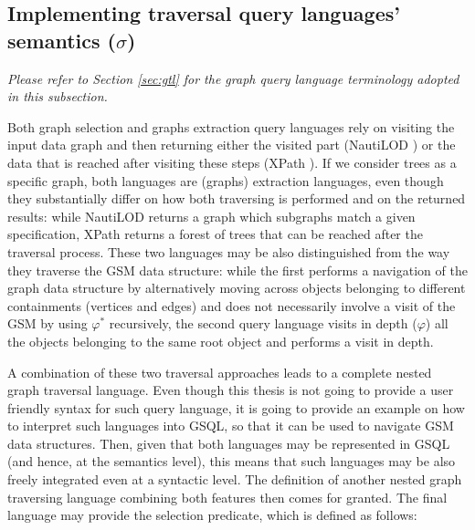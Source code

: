 
\subsection{Implementing traversal query languages' semantics ($\sigma$)}\label{traversalDef}
\textit{Please refer to Section \vref{sec:gtl} for the graph query language terminology adopted in this subsection.}
\bigskip

Both graph selection and graphs extraction query languages rely on visiting the input data graph and then returning either the visited part (NautiLOD \cite{NautiLOD}) or the data that is reached after visiting these steps (XPath \cite{xpath31}). If we consider trees as a specific  graph, both languages are (graphs) extraction languages, even though they substantially differ on how both traversing is performed and on the returned results: while NautiLOD returns a graph which subgraphs match a given specification, XPath returns a forest of trees that can be reached after the traversal process. These two languages may be also distinguished from the way they traverse the GSM data structure: while the first performs a navigation of the graph data structure by alternatively moving across objects belonging to different containments (vertices and edges) and does not necessarily involve a visit of the GSM by using $\varphi^*$ recursively, the second query language visits in depth ($\varphi$) all the objects belonging to the same root object and performs a visit in depth.

A combination of these two traversal approaches leads to a complete nested graph traversal language. Even though this thesis is not going to provide a user friendly syntax for such query language, it is going to provide an example on how to interpret such languages into GSQL, so that it can be used to navigate GSM data structures. Then, given that both languages may be represented in GSQL (and hence, at the semantics level), this means that such languages may be also freely integrated even at a syntactic level. The definition of another nested graph traversing language combining both features then comes for granted. The final language may provide the selection predicate, which is defined as follows:



